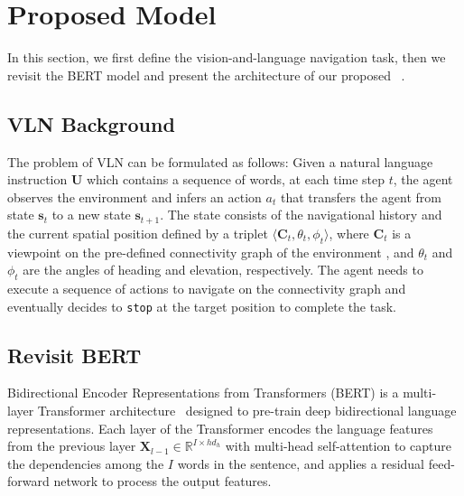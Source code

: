 \documentclass[final]{cvpr}
\begin{document}
 \section{Proposed Model} 
\label{sec:rvlnbert}

In this section, we first define the vision-and-language navigation task, then we revisit the BERT model \cite{devlin2019bert} and present the architecture of our proposed \vlnbert~.

\subsection{VLN Background}
The problem of VLN can be formulated as follows: Given a natural language instruction $\boldsymbol{U}$ which contains a sequence of words, at each time step $t$, the agent observes the environment and infers an action $a_{t}$ that transfers the agent from state $\boldsymbol{s}_{t}$ to a new state $\boldsymbol{s}_{t+1}$. The state consists of the navigational history and the current spatial position defined by a triplet $\langle \boldsymbol{C}_{t},\theta_{t},\phi_{t} \rangle$, where $\boldsymbol{C}_{t}$ is a viewpoint on the pre-defined connectivity graph of the environment \cite{anderson2018vision}, and $\theta_{t}$ and $\phi_{t}$ are the angles of heading and elevation, respectively. The agent needs to execute a sequence of actions to navigate on the connectivity graph and eventually decides to \texttt{stop} at the target position to complete the task.

\subsection{Revisit BERT}
Bidirectional Encoder Representations from Transformers (BERT) \cite{devlin2019bert} is a multi-layer Transformer architecture~\cite{vaswani2017attention} designed to pre-train deep bidirectional language representations.
Each layer of the Transformer encodes the language features from the previous layer $\boldsymbol{X}_{l-1}\in\mathbb{R}^{I\times{hd_{h}}}$ with multi-head self-attention to capture the dependencies among the $I$ words in the sentence, and applies a residual feed-forward network to process the output features.
\end{document}
